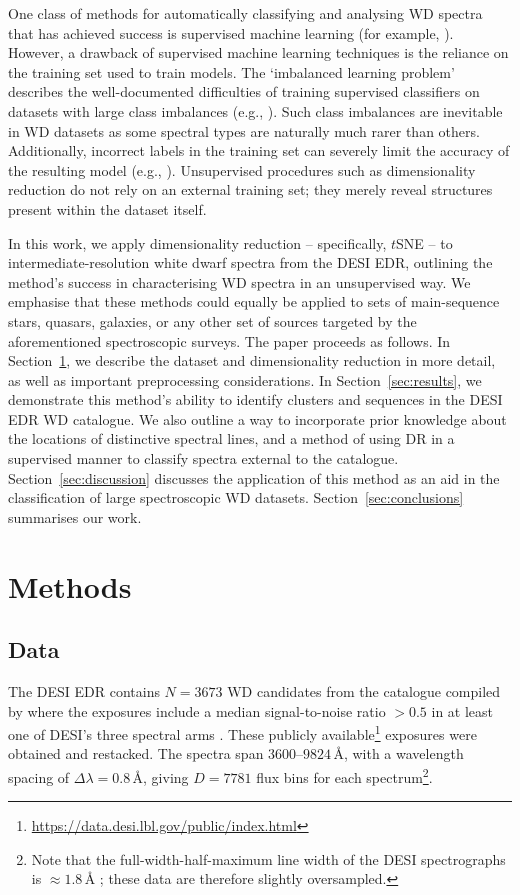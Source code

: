 \documentclass[fleqn,usenatbib]{mnras}
\begin{document}
One class of methods for automatically classifying and analysing WD spectra that has achieved success is supervised machine learning (for example, \citealt{yang20, tan23, garciazamora23, vincent23, vincent24}).
However, a drawback of supervised machine learning techniques is the reliance on the training set used to train models.
The `imbalanced learning problem' describes the well-documented difficulties of training supervised classifiers on datasets with large class imbalances (e.g., \citealt{he09, johnson19}).
Such class imbalances are inevitable in WD datasets as some spectral types are naturally much rarer than others.
Additionally, incorrect labels in the training set can severely limit the accuracy of the resulting model (e.g., \citealt{frenay14}).
Unsupervised procedures such as dimensionality reduction do not rely on an external training set; they merely reveal structures present within the dataset itself.

In this work, we apply dimensionality reduction -- specifically, $t$SNE -- to intermediate-resolution white dwarf spectra from the DESI EDR, outlining the method's success in characterising WD spectra in an unsupervised way.
We emphasise that these methods could equally be applied to sets of main-sequence stars, quasars, galaxies, or any other set of sources targeted by the aforementioned spectroscopic surveys.
The paper proceeds as follows.
In Section~\ref{sec:methods}, we describe the dataset and dimensionality reduction in more detail, as well as important preprocessing considerations.
In Section~\ref{sec:results}, we demonstrate this method's ability to identify clusters and sequences in the DESI EDR WD catalogue.
We also outline a way to incorporate prior knowledge about the locations of distinctive spectral lines, and a method of using DR in a supervised manner to classify spectra external to the catalogue.
Section~\ref{sec:discussion} discusses the application of this method as an aid in the classification of large spectroscopic WD datasets.
Section~\ref{sec:conclusions} summarises our work.

\section{Methods}
\label{sec:methods}

\subsection{Data}

The DESI EDR contains $N=3673$ WD candidates from the catalogue compiled by \citet{gentilefusillo19} where the exposures include a median signal-to-noise ratio $>0.5$ in at least one of DESI's three spectral arms \citep{manser24}.
These publicly available\footnote{
    \url{https://data.desi.lbl.gov/public/index.html}
} exposures were obtained and restacked.
The spectra span $3600$--$9824\,\text{\AA}$, with a wavelength spacing of $\Delta \lambda = 0.8\,\text{\AA}$, giving $D=7781$ flux bins for each spectrum\footnote{
    Note that the full-width-half-maximum line width of the DESI spectrographs is $\approx1.8\,\text{\AA}$ \citep{abareshi22}; these data are therefore slightly oversampled.
}.
\end{document}
